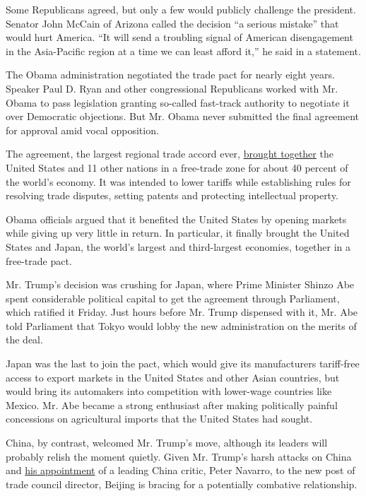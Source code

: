 Some Republicans agreed, but only a few would publicly challenge the
president. Senator John McCain of Arizona called the decision ``a
serious mistake'' that would hurt America. ``It will send a troubling
signal of American disengagement in the Asia-Pacific region at a time we
can least afford it,'' he said in a statement.

The Obama administration negotiated the trade pact for nearly eight
years. Speaker Paul D. Ryan and other congressional Republicans worked
with Mr. Obama to pass legislation granting so-called fast-track
authority to negotiate it over Democratic objections. But Mr. Obama
never submitted the final agreement for approval amid vocal opposition.

The agreement, the largest regional trade accord ever,
\href{https://www.nytimes3xbfgragh.onion/2015/06/15/world/asia/the-trans-pacific-trade-deal-and-a-presidents-legacy.html}{brought
together} the United States and 11 other nations in a free-trade zone
for about 40 percent of the world's economy. It was intended to lower
tariffs while establishing rules for resolving trade disputes, setting
patents and protecting intellectual property.

Obama officials argued that it benefited the United States by opening
markets while giving up very little in return. In particular, it finally
brought the United States and Japan, the world's largest and
third-largest economies, together in a free-trade pact.

Mr. Trump's decision was crushing for Japan, where Prime Minister Shinzo
Abe spent considerable political capital to get the agreement through
Parliament, which ratified it Friday. Just hours before Mr. Trump
dispensed with it, Mr. Abe told Parliament that Tokyo would lobby the
new administration on the merits of the deal.

Japan was the last to join the pact, which would give its manufacturers
tariff-free access to export markets in the United States and other
Asian countries, but would bring its automakers into competition with
lower-wage countries like Mexico. Mr. Abe became a strong enthusiast
after making politically painful concessions on agricultural imports
that the United States had sought.

China, by contrast, welcomed Mr. Trump's move, although its leaders will
probably relish the moment quietly. Given Mr. Trump's harsh attacks on
China and
\href{https://www.nytimes3xbfgragh.onion/2016/12/21/us/politics/peter-navarro-carl-icahn-trump-china-trade.html}{his
appointment} of a leading China critic, Peter Navarro, to the new post
of trade council director, Beijing is bracing for a potentially
combative relationship.

